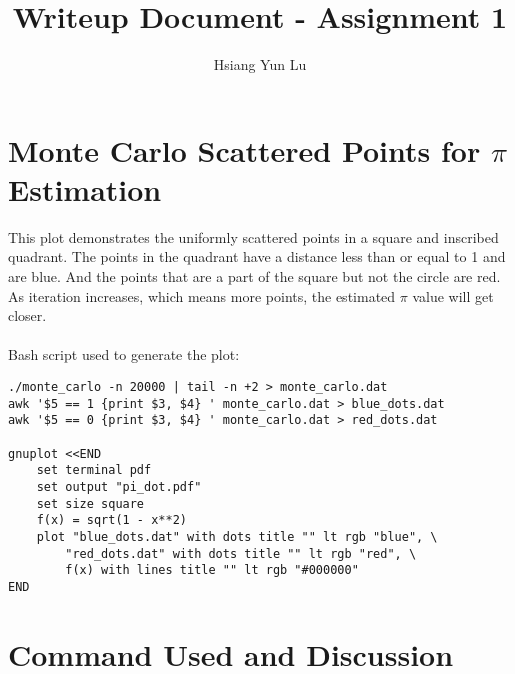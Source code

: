 \documentclass[12pt]{article}
\title{Writeup Document - Assignment 1}
\author{Hsiang Yun Lu}
\begin{document}
\maketitle

\section{Monte Carlo Scattered Points for $\pi$ Estimation}

This plot demonstrates the uniformly scattered points in a square and inscribed quadrant. The points in the quadrant have a distance less than or equal to 1 and are blue. And the points that are a part of the square but not the circle are red. As iteration increases, which means more points, the estimated $\pi$ value will get closer. \\
\\
Bash script used to generate the plot: \\
\begin{verbatim}
./monte_carlo -n 20000 | tail -n +2 > monte_carlo.dat
awk '$5 == 1 {print $3, $4} ' monte_carlo.dat > blue_dots.dat
awk '$5 == 0 {print $3, $4} ' monte_carlo.dat > red_dots.dat

gnuplot <<END
    set terminal pdf
    set output "pi_dot.pdf"
    set size square
    f(x) = sqrt(1 - x**2)
    plot "blue_dots.dat" with dots title "" lt rgb "blue", \
        "red_dots.dat" with dots title "" lt rgb "red", \
        f(x) with lines title "" lt rgb "#000000"
END

\end{verbatim}



\section{Command Used and Discussion}
\end{document}
